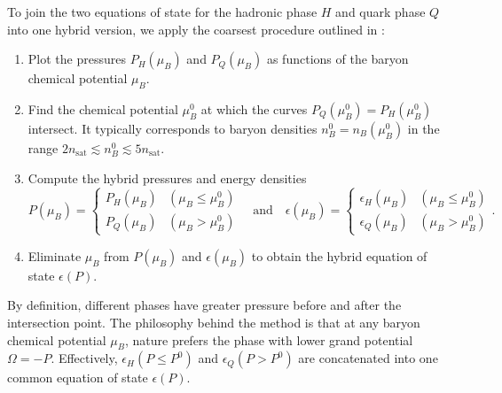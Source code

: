 To join the two equations of state for the hadronic phase $H$ and quark phase $Q$ into one hybrid version,
we apply the coarsest procedure outlined in \cite[section V-C]{ref:quark_star_review}:
\begin{enumerate}
\item \label{step:hybrid:one}%
      Plot the pressures $P_H(\mu_B)$ and $P_Q(\mu_B)$ as functions of the baryon chemical potential $\mu_B$.
\item \label{step:hybrid:two}%
      Find the chemical potential $\mu_B^0$ at which the curves $P_Q(\mu_B^0) = P_H(\mu_B^0)$ intersect.
      It typically corresponds to baryon densities $n_B^0 = n_B(\mu_B^0)$ in the range $2 n_\text{sat} \lesssim n_B^0 \lesssim 5 n_\text{sat}$.
\item \label{step:hybrid:three}%
      Compute the hybrid pressures and energy densities
      \begin{equation}
          P(\mu_B) = \begin{cases} P_H(\mu_B) & (\mu_B \leq \mu_B^0) \\ P_Q(\mu_B) & (\mu_B > \mu_B^0)  \end{cases}
          \quad \text{and} \quad
          \epsilon(\mu_B) = \begin{cases} \epsilon_H(\mu_B) & (\mu_B \leq \mu_B^0) \\ \epsilon_Q(\mu_B) & (\mu_B > \mu_B^0) \end{cases}.
      \label{eq:hybrid:pressure_energy_density}
      \end{equation}
\item \label{step:hybrid:four}%
      Eliminate $\mu_B$ from $P(\mu_B)$ and $\epsilon(\mu_B)$ to obtain the hybrid equation of state $\epsilon(P)$.
\end{enumerate}
By definition, different phases have greater pressure before and after the intersection point.
The philosophy behind the method is that at any baryon chemical potential $\mu_B$,
nature prefers the phase with lower grand potential $\Omega = -P$.
Effectively, $\epsilon_H(P \leq P^0)$ and $\epsilon_Q(P > P^0)$ are concatenated into one common equation of state $\epsilon(P)$.

